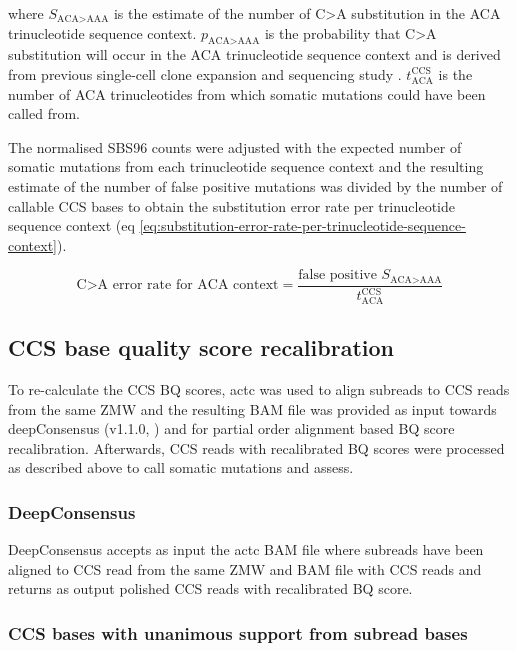where $S_{\text{ACA>AAA}}$ is the estimate of the number of C>A substitution in the ACA trinucleotide sequence context. $p_{\text{ACA>AAA}}$ is the probability that C>A substitution will occur in the ACA trinucleotide sequence context and is derived from previous single-cell clone expansion and sequencing study \cite{Mitchell2022-ry}. $t^{\text{CCS}}_{\text{ACA}}$ is the number of ACA trinucleotides from which somatic mutations could have been called from.

The normalised SBS96 counts were adjusted with the expected number of somatic mutations from each trinucleotide sequence context and the resulting estimate of the number of false positive mutations was divided by the number of callable CCS bases to obtain the substitution error rate per trinucleotide sequence context (eq \ref{eq:substitution-error-rate-per-trinucleotide-sequence-context}). 

\begin{equation} \label{eq:substitution-error-rate-per-trinucleotide-sequence-context}
\text{C>A error rate for ACA context} = \frac{\text{false positive } S_{\text{ACA>AAA}}}{t^{\text{CCS}}_{\text{ACA}}}
\end{equation}


\subsection{CCS base quality score recalibration}

To re-calculate the CCS BQ scores, actc \cite{} was used to align subreads to CCS reads from the same ZMW and the resulting BAM file was provided as input towards deepConsensus (v1.1.0, ) \cite {} and for partial order alignment based BQ score recalibration. Afterwards, CCS reads with recalibrated BQ scores were processed as described above to call somatic mutations and assess. 

\subsubsection{DeepConsensus}

DeepConsensus accepts as input the actc BAM file where subreads have been aligned to CCS read from the same ZMW and BAM file with CCS reads and returns as output polished CCS reads with recalibrated BQ score. 

\subsubsection{CCS bases with unanimous support from subread bases}

